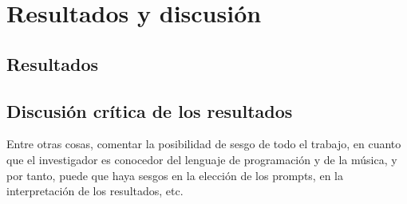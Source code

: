 \chapter{Resultados y discusión}

\section{Resultados}

\section{Discusión crítica de los resultados}
Entre otras cosas, comentar la posibilidad de sesgo de todo el trabajo, en cuanto que el investigador es conocedor del lenguaje de programación y de la música, y por tanto, puede que haya sesgos en la elección de los prompts, en la interpretación de los resultados, etc.


